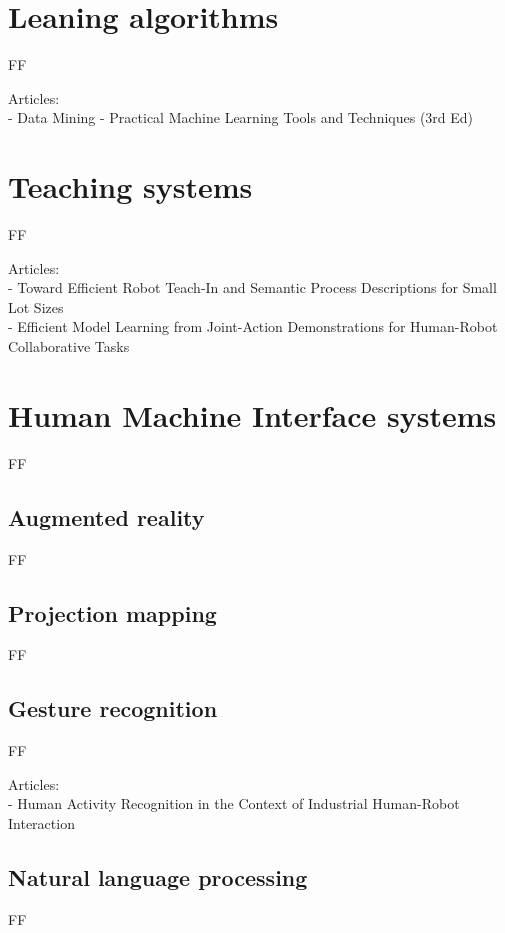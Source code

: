 \section{Leaning algorithms}

FF

Articles:\\
- Data Mining - Practical Machine Learning Tools and Techniques (3rd Ed)


\section{Teaching systems}

FF

Articles:\\
- Toward Efficient Robot Teach-In and Semantic Process Descriptions for Small Lot Sizes\\
- Efficient Model Learning from Joint-Action Demonstrations for Human-Robot Collaborative Tasks


\section{Human Machine Interface systems}

FF


\subsection{Augmented reality}

FF


\subsection{Projection mapping}

FF


\subsection{Gesture recognition}

FF

Articles:\\
- Human Activity Recognition in the Context of Industrial Human-Robot Interaction


\subsection{Natural language processing}

FF

